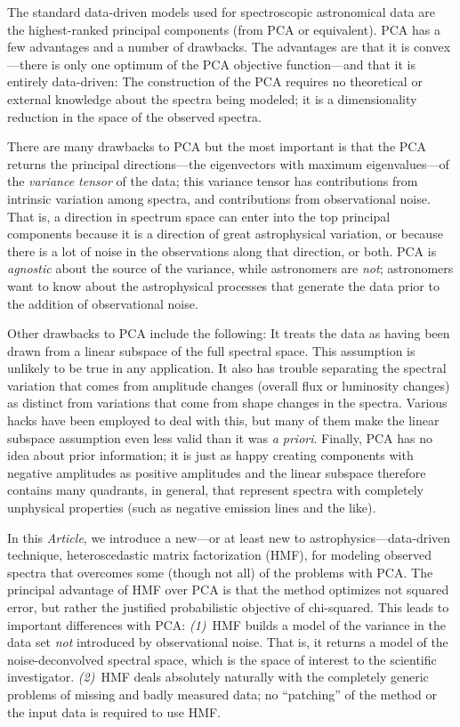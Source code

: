 \documentclass[12pt,preprint]{aastex}
\newcommand{\documentname}{\textsl{Article}}
\begin{document}
The standard data-driven models used for spectroscopic astronomical
data are the highest-ranked principal components (from PCA or
equivalent). PCA has a few advantages and a number of drawbacks.  The
advantages are that it is convex---there is only one optimum of the PCA
objective function---and that it is
entirely data-driven: The construction of the
PCA requires no theoretical or external knowledge about the spectra
being modeled; it is a dimensionality reduction in the space of the
observed spectra.

There are many drawbacks to PCA but the most important is that the PCA
returns the principal directions---the eigenvectors with maximum
eigenvalues---of the \emph{variance tensor} of the data; this variance
tensor has contributions from intrinsic variation among spectra, and
contributions from observational noise.  That is, a direction in
spectrum space can enter into the top principal components because it
is a direction of great astrophysical variation, or because there is a
lot of noise in the observations along that direction, or both.  PCA
is \emph{agnostic} about the source of the variance, while astronomers are
\emph{not}; astronomers want to know about the astrophysical processes that
generate the data prior to the addition of observational noise.

Other drawbacks to PCA include the following: It treats the data as
having been drawn from a linear subspace of the full spectral
space. This assumption is unlikely to be true in any application.  It
also has trouble separating the spectral variation that comes from
amplitude changes (overall flux or luminosity changes) as distinct
from variations that come from shape changes in the spectra.  Various
hacks have been employed to deal with this, but many of them make the
linear subspace assumption even less valid than it was \textit{a
  priori}. Finally, PCA has no idea about prior information; it is
just as happy creating components with negative amplitudes as positive
amplitudes and the linear subspace therefore contains many quadrants,
in general, that represent spectra with completely unphysical
properties (such as negative emission lines and the like).

In this \documentname, we introduce a new---or at least new to
astrophysics---data-driven technique, heteroscedastic matrix
factorization (HMF), for modeling observed spectra that overcomes some
(though not all) of the problems with PCA.  The principal advantage of
HMF over PCA is that the method optimizes not squared error, but
rather the justified probabilistic objective of chi-squared.  This
leads to important differences with PCA: \textsl{(1)}~HMF builds a
model of the variance in the data set \emph{not} introduced by
observational noise.  That is, it returns a model of the
noise-deconvolved spectral space, which is the space of interest to
the scientific investigator.  \textsl{(2)}~HMF deals absolutely
naturally with the completely generic problems of missing and badly
measured data; no ``patching'' of the method or the input data is
required to use HMF.
\end{document}
